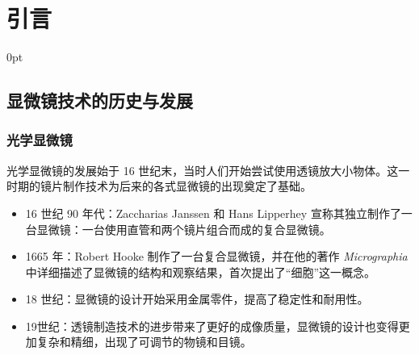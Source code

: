 \documentclass[zihao=-4]{ctexart}
\newcommand{\setParDis}{\setlength {\parskip} {0pt} }
\begin{document}
\section{引言}
	\setParDis %
	\begin{spacing}{1.5}
	\subsection{显微镜技术的历史与发展}
		\subsubsection[光学显微镜]{光学显微镜}
			光学显微镜的发展始于 16 世纪末，当时人们开始尝试使用透镜放大小物体。这一时期的镜片制作技术为后来的各式显微镜的出现奠定了基础。	
			\begin{itemize}
				\item 16 世纪 90 年代：Zaccharias Janssen 和 Hans Lipperhey 宣称其独立制作了一台显微镜：一台使用直管和两个镜片组合而成的复合显微镜。
				\item 1665 年：Robert Hooke 制作了一台复合显微镜，并在他的著作 {\it Micrographia}中详细描述了显微镜的结构和观察结果，首次提出了“细胞”这一概念。
				\item 18 世纪：显微镜的设计开始采用金属零件，提高了稳定性和耐用性。
				\item 19世纪：透镜制造技术的进步带来了更好的成像质量，显微镜的设计也变得更加复杂和精细，出现了可调节的物镜和目镜。
			\end{itemize}


\end{spacing}
\end{document}
